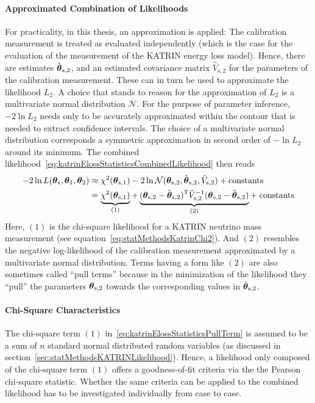 \paragraph{Approximated Combination of Likelihoods}
For practicality, in this thesis, an approximation is applied: The calibration measurement is treated as evaluated independently (which is the case for the evaluation of the measurement of the KATRIN energy loss model). Hence, there are estimates $\hat{\boldsymbol{\mathbf{\theta}}}_\mathrm{s,2}$, and an estimated covariance matrix $\hat{V}_\mathrm{s,2}$ for the parameters of the calibration measurement. These can in turn be used to approximate the likelihood $L_2$. A choice that stands to reason for the approximation of $L_2$ is a multivariate normal distribution $\mathcal{N}$. For the purpose of parameter inference, $-2\ln L_2$ needs only to be accurately approximated within the contour that is needed to extract confidence intervals. The choice of a multivariate normal distribution corresponds a symmetric approximation in second order of $-\ln L_2$ around its minimum. The combined likelihood~\eqref{eq:katrinElossStatisticsCombinedLikelihood} then reads
\begin{equation}
\begin{split}
\label{eq:katrinElossStatisticsPullTerm}
-2\ln L(\paramVecShared, \paramVec_1, \paramVec_2) &\approx
\chi^2(\paramVecSOne) 
-2\ln \mathcal{N}(\paramVecSTwo, \hat{\paramVec}_\mathrm{s,2}, \hat{V}_\mathrm{s,2}) +
\mathrm{ constants}\\ &=
\underbrace{
	\chi^2(\paramVecSOne)
	\vphantom{(\paramVecSTwo - \hat{\paramVec}_\mathrm{s,2})^{\mathsf{T}}}
}_{(1)}
+
\underbrace{
	(\paramVec_\mathrm{s,2} - \hat{\paramVec}_\mathrm{s,2})^{\mathsf{T}}
	\hat{V}_\mathrm{s,2}^{-1}
	(\paramVec_\mathrm{s,2} - \hat{\paramVec}_\mathrm{s,2})
}_{(2)} +\; 
\mathrm{ constants}
\end{split}
\end{equation}
Here, $(1)$ is the chi-square likelihood for a KATRIN neutrino mass measurement (see equation~\ref{eq:statMethodsKatrinChi2}). And $(2)$ resembles the negative log-likelihood of the calibration measurement approximated by a multivariate normal distribution. Terms having a form like $(2)$ are also sometimes called ``pull terms'' because in the minimization of the likelihood they ``pull'' the parameters $\boldsymbol{\mathbf{\theta}}_\mathrm{s,2}$ towards the corresponding values in $\hat{\boldsymbol{\mathbf{\theta}}}_\mathrm{s,2}$.

\paragraph{Chi-Square Characteristics}
The chi-square term $(1)$ in~\eqref{eq:katrinElossStatisticsPullTerm} is assumed to be a sum of $n$ standard normal distributed random variables (as discussed in section~\ref{sec:statMethodsKATRINLikelihood}). Hence, a likelihood only composed of the chi-square term $(1)$ offers a goodness-of-fit criteria via the the Pearson chi-square statistic. Whether the same criteria can be applied to the combined likelihood has to be investigated individually from case to case.

